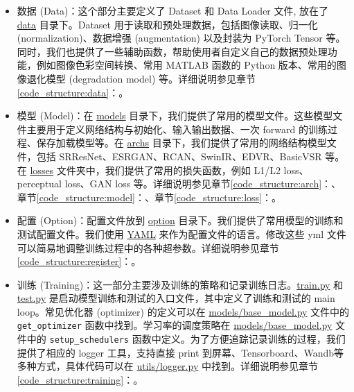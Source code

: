 \documentclass[../main.tex]{subfiles}
\begin{document}
\begin{itemize}
    \item 数据 (Data)：这个部分主要定义了 Dataset 和 Data Loader 文件, 放在了 \href{https://github.com/XPixelGroup/BasicSR/tree/master/basicsr/data}{data} 目录下。Dataset 用于读取和预处理数据，包括图像读取、归一化 (normalization)、数据增强 (augmentation) 以及封装为 PyTorch Tensor 等。同时，我们也提供了一些辅助函数，帮助使用者自定义自己的数据预处理功能，例如图像色彩空间转换、常用 MATLAB 函数的 Python 版本、常用的图像退化模型 (degradation model) 等。详细说明参见章节\ref{code_structure:data}：。

    \item 模型 (Model)：在 \href{https://github.com/XPixelGroup/BasicSR/tree/master/basicsr/models}{models} 目录下，我们提供了常用的模型文件。这些模型文件主要用于定义网络结构与初始化、输入输出数据、一次 forward 的训练过程、保存加载模型等。在 \href{https://github.com/XPixelGroup/BasicSR/tree/master/basicsr/archs}{archs} 目录下，我们提供了常用的网络结构模型文件，包括 SRResNet、ESRGAN、RCAN、SwinIR、EDVR、BasicVSR 等。在 \href{https://github.com/XPixelGroup/BasicSR/tree/master/basicsr/losses}{losses} 文件夹中，我们提供了常用的损失函数，例如 L1/L2 loss、perceptual loss、GAN loss 等。详细说明参见章节\ref{code_structure:arch}：、章节\ref{code_structure:model}：、章节\ref{code_structure:loss}：。

    \item 配置 (Option)：配置文件放到 \href{https://github.com/XPixelGroup/BasicSR/tree/master/options}{option} 目录下。我们提供了常用模型的训练和测试配置文件。我们使用 \href{https://yaml.org/}{YAML} 来作为配置文件的语言。修改这些 yml 文件可以简易地调整训练过程中的各种超参数。详细说明参见章节\ref{code_structure:register}：。

    \item 训练 (Training)：这一部分主要涉及训练的策略和记录训练日志。\href{https://github.com/XPixelGroup/BasicSR/blob/master/basicsr/train.py}{train.py} 和 \href{https://github.com/XPixelGroup/BasicSR/blob/master/basicsr/test.py}{test.py} 是启动模型训练和测试的入口文件，其中定义了训练和测试的 main loop。常见优化器 (optimizer) 的定义可以在 \href{https://github.com/XPixelGroup/BasicSR/blob/master/basicsr/models/base_model.py}{models/base\_model.py} 文件中的 \texttt{get\_optimizer} 函数中找到。学习率的调度策略在 \href{https://github.com/XPixelGroup/BasicSR/blob/master/basicsr/models/base_model.py}{models/base\_model.py}  文件中的 \texttt{setup\_schedulers} 函数中定义。为了方便追踪记录训练的过程，我们提供了相应的 logger 工具，支持直接 print 到屏幕、Tensorboard、Wandb等多种方式，具体代码可以在 \href{https://github.com/XPixelGroup/BasicSR/blob/master/basicsr/utils/logger.py}{utils/logger.py} 中找到。详细说明参见章节\ref{code_structure:training}：。


\end{itemize}
\end{document}
